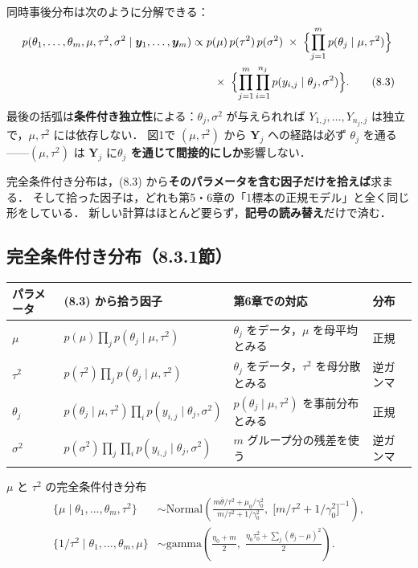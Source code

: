 \documentclass[lualatex,ja=standard,a4paper,12pt]{bxjsarticle}
\begin{document}
同時事後分布は次のように分解できる：
\begin{align*}
  p(\theta_1, \ldots, \theta_m, \mu, \tau^2, \sigma^2 \mid \bm{y}_1, \ldots, \bm{y}_m)
  &\propto p(\mu)\,p(\tau^2)\,p(\sigma^2)
   \;\times\; \Bigl\{\prod_{j=1}^m p(\theta_j \mid \mu, \tau^2)\Bigr\} \\
  &\qquad \times\; \Bigl\{\prod_{j=1}^m \prod_{i=1}^{n_j} p(y_{i,j} \mid \theta_j, \sigma^2)\Bigr\}. \tag{8.3}
\end{align*}
最後の括弧は\textbf{条件付き独立性}による：$\theta_j, \sigma^2$ が与えられれば
$Y_{1,j}, \ldots, Y_{n_j,j}$ は独立で，$\mu, \tau^2$ には依存しない．
図1で $(\mu, \tau^2)$ から $\bm{Y}_j$ への経路は必ず $\theta_j$ を通る
——$(\mu, \tau^2)$ は $\bm{Y}_j$ に\textbf{$\theta_j$ を通じて間接的にしか}影響しない．

\begin{pointbox}
完全条件付き分布は，(8.3) から\textbf{そのパラメータを含む因子だけを拾えば}求まる．
そして拾った因子は，どれも第5・6章の「1標本の正規モデル」と全く同じ形をしている．
新しい計算はほとんど要らず，\textbf{記号の読み替え}だけで済む．
\end{pointbox}

\subsection{完全条件付き分布（8.3.1節）}

\begin{center}
\small
\renewcommand{\arraystretch}{1.5}
\setlength{\tabcolsep}{4pt}
\begin{tabular}{llll}
\toprule
パラメータ & (8.3) から拾う因子 & 第6章での対応 & 分布 \\
\midrule
$\mu$ & $p(\mu)\prod_j p(\theta_j \mid \mu, \tau^2)$ & $\theta_j$ をデータ，$\mu$ を母平均とみる & 正規 \\
$\tau^2$ & $p(\tau^2)\prod_j p(\theta_j \mid \mu, \tau^2)$ & $\theta_j$ をデータ，$\tau^2$ を母分散とみる & 逆ガンマ \\
$\theta_j$ & $p(\theta_j \mid \mu, \tau^2)\prod_i p(y_{i,j} \mid \theta_j, \sigma^2)$ & $p(\theta_j \mid \mu, \tau^2)$ を事前分布とみる & 正規 \\
$\sigma^2$ & $p(\sigma^2)\prod_j\prod_i p(y_{i,j} \mid \theta_j, \sigma^2)$ & $m$ グループ分の残差を使う & 逆ガンマ \\
\bottomrule
\end{tabular}
\end{center}

\begin{thmbox}{$\mu$ と $\tau^2$ の完全条件付き分布}
\begin{align*}
  \{\mu \mid \theta_1, \ldots, \theta_m, \tau^2\} &\sim
    \mathrm{Normal}\!\left(\frac{m\bar{\theta}/\tau^2 + \mu_0/\gamma_0^2}{m/\tau^2 + 1/\gamma_0^2},\;
    \bigl[m/\tau^2 + 1/\gamma_0^2\bigr]^{-1}\right), \\
  \{1/\tau^2 \mid \theta_1, \ldots, \theta_m, \mu\} &\sim
    \mathrm{gamma}\!\left(\frac{\eta_0 + m}{2},\; \frac{\eta_0\tau_0^2 + \sum_j (\theta_j - \mu)^2}{2}\right).
\end{align*}
\end{thmbox}
\end{document}
